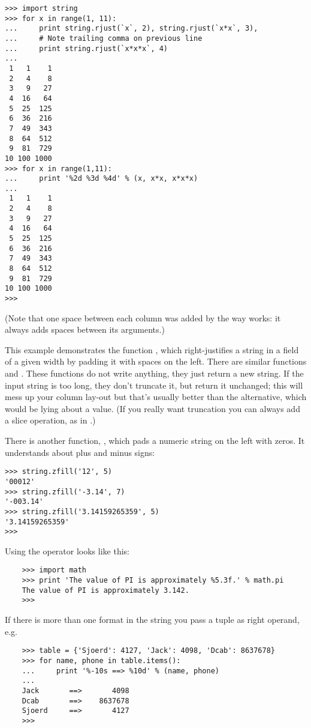\bcode\begin{verbatim}
>>> import string
>>> for x in range(1, 11):
...     print string.rjust(`x`, 2), string.rjust(`x*x`, 3),
...     # Note trailing comma on previous line
...     print string.rjust(`x*x*x`, 4)
...
 1   1    1
 2   4    8
 3   9   27
 4  16   64
 5  25  125
 6  36  216
 7  49  343
 8  64  512
 9  81  729
10 100 1000
>>> for x in range(1,11):
...     print '%2d %3d %4d' % (x, x*x, x*x*x)
... 
 1   1    1
 2   4    8
 3   9   27
 4  16   64
 5  25  125
 6  36  216
 7  49  343
 8  64  512
 9  81  729
10 100 1000
>>>
\end{verbatim}\ecode
%
(Note that one space between each column was added by the way 
works: it always adds spaces between its arguments.)

This example demonstrates the function , which
right-justifies a string in a field of a given width by padding it with
spaces on the left.  There are similar functions 
and .  These functions do not write anything, they
just return a new string.  If the input string is too long, they don't
truncate it, but return it unchanged; this will mess up your column
lay-out but that's usually better than the alternative, which would be
lying about a value.  (If you really want truncation you can always add
a slice operation, as in .)

There is another function, , which pads a numeric
string on the left with zeros.  It understands about plus and minus
signs:

\bcode\begin{verbatim}
>>> string.zfill('12', 5)
'00012'
>>> string.zfill('-3.14', 7)
'-003.14'
>>> string.zfill('3.14159265359', 5)
'3.14159265359'
>>>
\end{verbatim}\ecode
%
Using the \code{\%} operator looks like this:

\begin{verbatim}
    >>> import math
    >>> print 'The value of PI is approximately %5.3f.' % math.pi
    The value of PI is approximately 3.142.
    >>> 
\end{verbatim}

If there is more than one format in the string you pass a tuple as
right operand, e.g.

\begin{verbatim}
    >>> table = {'Sjoerd': 4127, 'Jack': 4098, 'Dcab': 8637678}
    >>> for name, phone in table.items():
    ...     print '%-10s ==> %10d' % (name, phone)
    ... 
    Jack       ==>       4098
    Dcab       ==>    8637678
    Sjoerd     ==>       4127
    >>> 
\end{verbatim}

